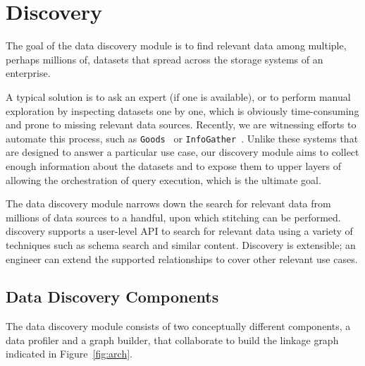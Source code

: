 \section{Discovery}
\label{sec:discovery}

The goal of the data discovery module is to find relevant data among multiple, perhaps millions of, datasets that spread across the storage systems of an enterprise.

A typical solution is to ask an expert (if one is available), or to perform manual exploration by inspecting datasets one by one, which is obviously time-consuming and prone to missing relevant data sources.
Recently, we are witnessing efforts to automate this process, such as \texttt{Goods}~\cite{DBLP:conf/sigmod/HalevyKNOPRW16} or \texttt{InfoGather}~\cite{ref}. Unlike these systems that are designed to answer a particular use case, our discovery module aims to collect enough information about the datasets and to expose them to upper layers of \dcv allowing the orchestration of query execution, which is the ultimate goal.

The data discovery module narrows down the search for relevant data from millions of data sources to a handful, upon which stitching can be performed. \dcv discovery supports a user-level API to search for relevant data using a variety of techniques such as schema search and similar content. Discovery is extensible; an engineer can extend the supported relationships to cover other relevant use cases.

\subsection{Data Discovery Components}

The data discovery module consists of two conceptually different components, a data profiler and a graph builder, that collaborate to build the linkage graph indicated in Figure~\ref{fig:arch}.

